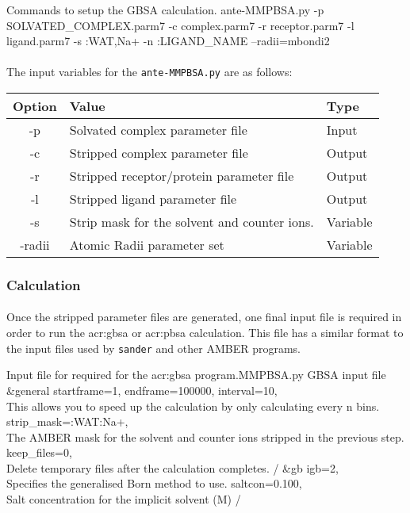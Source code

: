     \begin{bashcmd}[label=listing:gbsa-init]{Commands to setup the GBSA calculation.}
    ante-MMPBSA.py -p SOLVATED_COMPLEX.parm7 -c complex.parm7 -r receptor.parm7 -l ligand.parm7 -s :WAT,Na+ -n :LIGAND_NAME --radii=mbondi2
    \end{bashcmd}

    \paragraph{}
    The input variables for the \texttt{ante-MMPBSA.py} are as follows:

\begin{table}[H]
\centering
\begin{tabular}{@{}cll@{}}
\toprule
\multicolumn{1}{l}{\textbf{Option}} & \textbf{Value}    & \textbf{Type} \\ \midrule
-p      & Solvated complex parameter file               & Input         \\
-c      & Stripped complex parameter file               & Output        \\
-r      & Stripped receptor/protein parameter file      & Output        \\
-l      & Stripped ligand parameter file                & Output        \\
-s      & Strip mask for the solvent and counter ions.  & Variable      \\
-radii  & Atomic Radii parameter set                    & Variable      \\ 
\bottomrule
\end{tabular}
\end{table}

    \subsubsection{Calculation}
    \paragraph{}
    Once the stripped parameter files are generated, one final input file is required in order to run the \gls{acr:gbsa} or \gls{acr:pbsa} calculation. This file has a similar format to the input files used by \texttt{sander} and other AMBER programs.

    \begin{inpfile}[label=file:pbsa]{Input file for required for the \gls{acr:gbsa} program.}{MMPBSA.py}
GBSA input file
&general
        startframe=1, endframe=100000, interval=10, \\ This allows you to speed up the calculation by only calculating every n bins.
        strip_mask=:WAT:Na+, \\ The AMBER mask for the solvent and counter ions stripped in the previous step.
        keep_files=0, \\ Delete temporary files after the calculation completes.
/
&gb
        igb=2, \\ Specifies the generalised Born method to use.
        saltcon=0.100, \\ Salt concentration for the implicit solvent (M)
/
    \end{inpfile}

